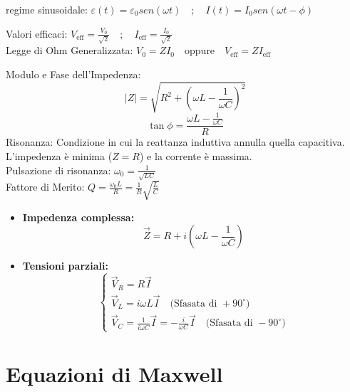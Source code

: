 \documentclass{book}
\begin{document}
regime sinusoidale:
$ \varepsilon(t) = \varepsilon_0 sen(\omega t)\quad ; \quad I(t) = I_0 sen(\omega t - \phi) $

Valori efficaci:
$
    V_{\text{eff}} = \frac{V_0}{\sqrt{2}} \quad ; \quad I_{\text{eff}} = \frac{I_0}{\sqrt{2}}
$ \\
 Legge di Ohm Generalizzata:
$ V_0 = Z I_0 \quad \text{oppure} \quad V_{\text{eff}} = Z I_{\text{eff}}$

Modulo e Fase dell'Impedenza:
$$
    |Z| = \sqrt{R^2 + \left(\omega L - \frac{1}{\omega C}\right)^2}
$$
\[
    \tan \phi = \frac{\omega L - \frac{1}{\omega C}}{R}
\]
Risonanza:
Condizione in cui la reattanza induttiva annulla quella capacitiva. L'impedenza è minima ($Z=R$) e la corrente è massima.\\
Pulsazione di risonanza: $ \omega_0 = \frac{1}{\sqrt{LC}}$\\
Fattore di Merito: $ Q = \frac{\omega_0 L}{R} = \frac{1}{R}\sqrt{\frac{L}{C}}$


\begin{itemize}
    \item \textbf{Impedenza complessa:}
    \[
        \vec{Z} = R + i\left(\omega L - \frac{1}{\omega C}\right)
    \]
    \item \textbf{Tensioni parziali:}
    \[
    \begin{cases}
        \vec{V}_R = R \vec{I} \\
        \vec{V}_L = i \omega L \vec{I} \quad \text{(Sfasata di } +90^\circ\text{)} \\
        \vec{V}_C = \frac{1}{i \omega C} \vec{I} = - \frac{i}{\omega C} \vec{I} \quad \text{(Sfasata di } -90^\circ\text{)}
    \end{cases}
    \]
\end{itemize}

\section*{Equazioni di Maxwell}

\begingroup
\scriptsize 
\setlength{\tabcolsep}{6pt}
\renewcommand{\arraystretch}{0.95}
\end{document}
